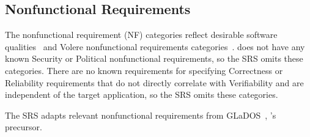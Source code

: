\subsection{Nonfunctional Requirements}\label{sec_ReqsNF}
The nonfunctional requirement (NF) categories reflect desirable software
qualities~\citep{ghezzifundamentals2003} and Volere nonfunctional requirements
categories~\citep{robertson2010mastering}. \progname{} does not have any known
Security or Political nonfunctional requirements, so the SRS omits these
categories. There are no known requirements for specifying Correctness or
Reliability requirements that do not directly correlate with Verifiability and
are independent of the target application, so the SRS omits these categories.

The SRS adapts relevant nonfunctional requirements from
GLaDOS~\citep[p.~144--164]{glados}, \progname{}'s precursor.

